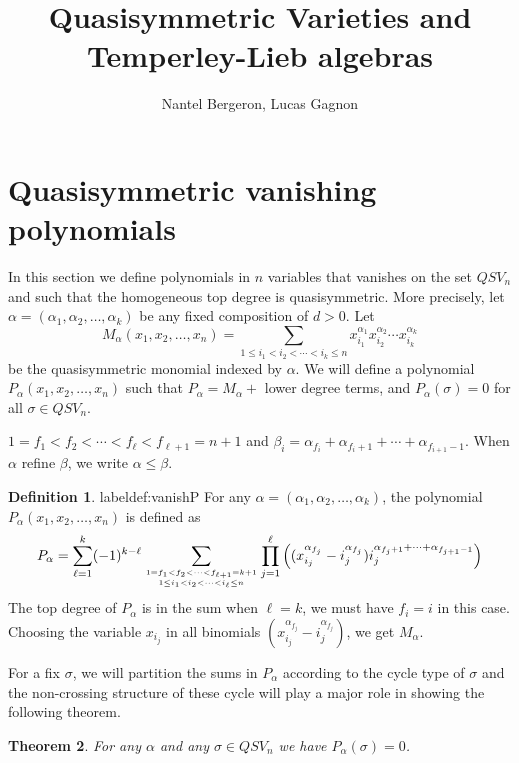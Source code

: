 \documentclass[11pt,oneside]{amsart}
\title{Quasisymmetric Varieties and Temperley-Lieb algebras}
\author{Nantel Bergeron,
Lucas Gagnon}
\date{}
\newtheorem{theorem}{Theorem}[section]
\theoremstyle{definition}
\newtheorem{definition}[theorem]{Definition}
\numberwithin{equation}{section}
\begin{document}
\begin{abstract}
\end{abstract} 

\maketitle

\section{Quasisymmetric vanishing polynomials}
In this section we define polynomials in $n$ variables that vanishes on the set $QSV_n$ and such that
the homogeneous top degree is quasisymmetric. More precisely, let $\alpha=(\alpha_1,\alpha_2,\ldots,\alpha_k)$
be any fixed composition of $d>0$. Let 
	$$M_\alpha(x_1,x_2,\ldots,x_n)=\sum_{1\le i_1<i_2<\cdots<i_k\le n} x_{i_1}^{\alpha_1} x_{i_2}^{\alpha_2}\cdots  x_{i_k}^{\alpha_k}$$
be the quasisymmetric monomial indexed by $\alpha$. We will define a polynomial $P_\alpha(x_1,x_2,\ldots,x_n)$ such that
  $P_\alpha = M_\alpha +$  lower degree terms, and  $P_\alpha(\sigma)=0$  for all $\sigma\in QSV_n$.

$1=f_1<f_2<\cdots <f_\ell<f_{\ell+1}=n+1$ and 
$\beta_i=\alpha_{f_i}+\alpha_{f_i+1}+\cdots+\alpha_{f_{i+1}-1}$.
When $\alpha$ refine $\beta$, we write $\alpha\le\beta$.

\begin{definition}label{def:vanishP}
 For any $\alpha=(\alpha_1,\alpha_2,\ldots,\alpha_k)$, the polynomial $P_\alpha(x_1,x_2,\ldots,x_n)$ is defined as
	$$P_\alpha=\sum_{\ell=1}^k (-1)^{k-\ell} \sum_{1=f_1<f_2<\cdots <f_{\ell+1}=k+1  \atop 1\le i_1<i_2<\cdots < i_\ell\le n} \prod_{j=1}^\ell 
	      \Big( (x_{i_j}^{\alpha_{f_j}}- i_j^{\alpha_{f_j }})  i_j^{\alpha_{f_j +1}+\cdots+\alpha_{f_{j +1}-1}} \Big)
	      $$
	      The top degree of $P_\alpha$ is in the sum when $\ell=k$, we must have $f_i=i$ in this case. Choosing the variable $x_{i_j}$ in all binomials $(x_{i_j}^{\alpha_{f_j}}- i_j^{\alpha_{f_j }})$, we get $M_\alpha$.
\end{definition}
	      
For a fix $\sigma$, we will partition the sums in $P_\alpha$ according to the cycle type of $\sigma$ and the non-crossing structure
of these cycle will play a major role in showing the following theorem.

\begin{theorem}\label{thm:vanishing}
 For any $\alpha$ and any $\sigma\in QSV_n$ we  have $P_\alpha(\sigma)=0$.
\end{theorem}
\end{document}
